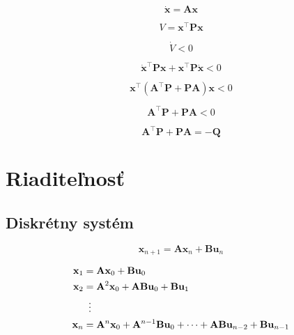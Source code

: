 \documentclass[a4paper, 10pt, ]{article}
\begin{document}
\begin{equation}
    \dot{\bm{x}} = \bm{A} \bm{x}
\end{equation}

\begin{equation}
    V = \bm{x}^\top \bm{P} \bm{x}
\end{equation}

\begin{equation}
    \dot{V} < 0
\end{equation}

\begin{equation}
    \dot{\bm{x}}^\top \bm{P} \bm{x} + \bm{x}^\top \bm{P} \dot{\bm{x}} < 0
\end{equation}

\begin{equation}
    \bm{x}^\top \left( \bm{A}^\top \bm{P} + \bm{P} \bm{A} \right) \bm{x} < 0
\end{equation}

\begin{equation}
    \bm{A}^\top \bm{P} + \bm{P} \bm{A} < 0
\end{equation}

\begin{equation}
    \bm{A}^\top \bm{P} + \bm{P} \bm{A} = -\bm{Q}
\end{equation}



\section{Riaditeľnosť}


\subsection{Diskrétny systém}

\begin{equation}
    \bm{x}_{n + 1} = \bm{A} \bm{x}_{n} + \bm{B} \bm{u}_{n}
\end{equation}

\begin{subequations}
    \begin{align}
        \bm{x}_{1} &= \bm{A} \bm{x}_{0} + \bm{B} \bm{u}_{0} \\
        \bm{x}_{2} &= \bm{A}^2 \bm{x}_{0} + \bm{A} \bm{B} \bm{u}_{0} + \bm{B} \bm{u}_{1} \\
        &\vdotswithin{=} \nonumber \\
        \bm{x}_{n} &= \bm{A}^{n} \bm{x}_{0} + \bm{A}^{n - 1} \bm{B} \bm{u}_{0} + \cdots + \bm{A} \bm{B} \bm{u}_{n - 2} + \bm{B} \bm{u}_{n - 1}
    \end{align}
\end{subequations}
\end{document}
